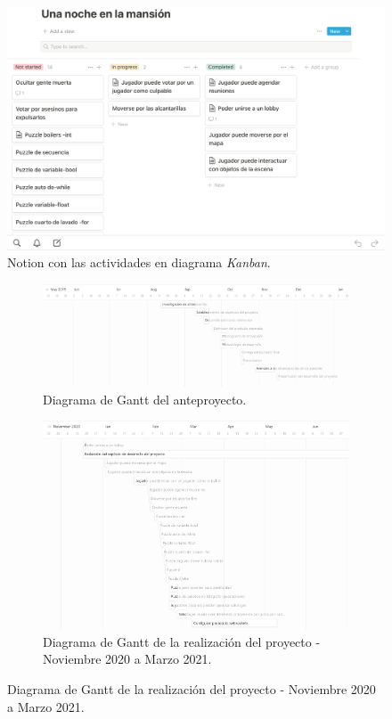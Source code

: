 \begin{figure}[H]
    \centering
    \includegraphics[width=0.8\linewidth]{images/notion.png}
    \caption{Notion con las actividades en diagrama \textit{Kanban}.}
    \label{fig:notion_proyecto}
\end{figure}
\begin{figure}
    \centering
    \caption{Diagrama de Gantt del proyecto.}
    \label{fig:diagrama_gantt}
    \begin{subfigure}{\textwidth}
        \centering
        \includegraphics[width=0.8\linewidth]{images/ago-dec-19.png}
        \caption{Diagrama de Gantt del anteproyecto.}
        \label{fig:gantt_anteproyecto}
    \end{subfigure}
    \begin{subfigure}{\textwidth}
        \centering
        \includegraphics[width=0.8\linewidth]{images/ene-mar-21.png}
        \caption{Diagrama de Gantt de la realización del proyecto - Noviembre 2020 a Marzo 2021.}
        \label{fig:gantt_proyecto}
    \end{subfigure}
\end{figure}
